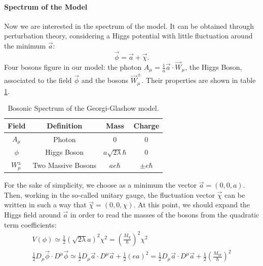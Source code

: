 \documentclass[main.tex]{subfiles}
\begin{document}
\paragraph{Spectrum of the Model}
Now we are interested in the spectrum of the model. It can be obtained through perturbation theory, considering a Higgs potential with little fluctuation around the minimum $\vec{a}$:
\begin{equation}
\vec{\phi} = \vec{a}+ \vec{\chi}. 
\end{equation} 
Four bosons figure in our model: the photon $A_{\mu} = \frac{1}{a} \vec{a}\cdot \vec{W}_\mu $, the Higgs Boson, associated to the field $\vec{\phi}$ and the bosons $\vec{W}_\mu^\pm$. Their properties are shown in table \ref{tab:Bosons}.
\begin{table}[H]
\centering
\begin{tabular}{cc|cc}
\toprule
 Field  &   Definition   &  Mass  &  Charge \\
 \midrule
 $A_{\mu}$ &          Photon                   &  0                             &     0 \\
 $\phi $   &          Higgs Boson              &  $a \sqrt{2 \lambda} \hbar $   &     0 \\
$ W_{\mu}^{\pm} $&    Two Massive Bosons &  $ae\hbar$                     &    $ \pm e \hbar$ \\
 \bottomrule
\end{tabular}
\caption{Bosonic Spectrum of the Georgi-Glashow model.}
\label{tab:Bosons}
\end{table}
%
%
For the sake of simplicity, we choose as a minimum the vector $\vec{a}= (0,0,a)$. Then, working in the so-called unitary gauge, the fluctuation vector $\vec{\chi}$ can be written in such a way that $\vec{\chi} = (0,0,\chi) $.
At this point, we should expand the Higgs field around $\vec{a}$ in order to read the masses of the bosons from the quadratic term coefficients:
\begin{subequations}
 \begin{gather}
V(\phi)\simeq  \frac{1}{2}  \left(\sqrt{2 \lambda} a\right)^2 \chi^2 = \left( \frac{M_\chi}{\hbar }\right)^2 \chi^2 \\
 \frac{1}{2}D_{\mu}\vec{\phi} \cdot  D^\mu \vec{\phi} \simeq  \frac{1}{2}D_{\mu}\vec{a} \cdot  D^\mu \vec{a}  + \frac{1}{2} \left( ea \right)^2 =\frac{1}{2}D_{\mu}\vec{a} \cdot  D^\mu \vec{a}  + \frac{1}{2} \left( \frac{M_W}{\hbar} \right)^2
\end{gather}
\end{subequations}
\end{document}
